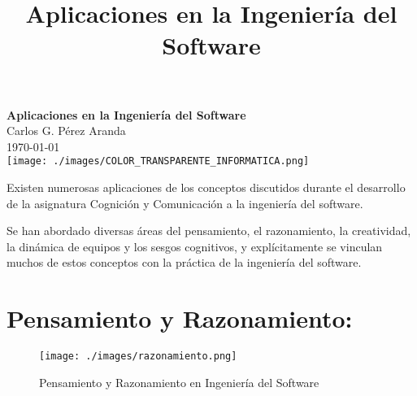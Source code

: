 \documentclass[a4paper,12pt,twoside]{article}
\title{Aplicaciones en la Ingeniería del Software}
\author{}
\date{}
\begin{document}
\begin{titlepage}
    \centering
    \vspace*{2cm}
    {\Huge \textbf{Aplicaciones en la Ingeniería del Software}}\\[1.5cm]
    {\Large Carlos G. Pérez Aranda}\\[0.5cm]
    {\large \today}\\[2cm]
    \vfill
    \texttt{[image: ./images/COLOR\_TRANSPARENTE\_INFORMATICA.png]} 
\end{titlepage}


\newpage
\tableofcontents
\newpage

Existen numerosas aplicaciones de los conceptos discutidos durante el desarrollo de la asignatura Cognición y Comunicación a la ingeniería del software.

Se han abordado diversas áreas del pensamiento, el razonamiento, la creatividad, la dinámica de equipos y los sesgos cognitivos, y explícitamente se 
vinculan muchos de estos conceptos con la práctica de la ingeniería del software.

\section{Pensamiento y Razonamiento:}

\begin{figure}[H]
    \centering
    \texttt{[image: ./images/razonamiento.png]}
    \caption{Pensamiento y Razonamiento en Ingeniería del Software}
    \label{fig:pensamiento_razonamiento}
\end{figure}
\end{document}
